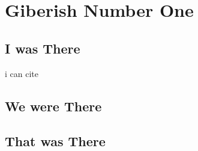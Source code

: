 \chapter{Giberish Number One}

\section{I was There}

i can cite \cite{khalil}
\section{We were There}
\section{That was There}

